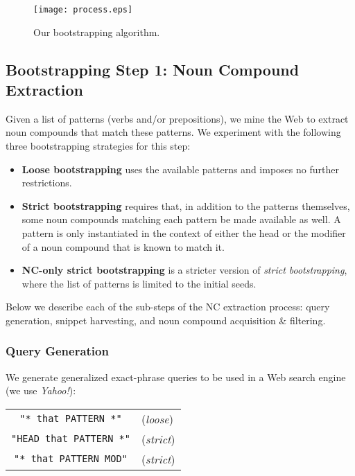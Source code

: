 \documentclass[letterpaper,11pt]{article}
\begin{document}
\begin{figure}[tbh]
\begin{center}
\texttt{[image: process.eps]}
\end{center}
\caption{Our bootstrapping algorithm.}
\label{fig:process}
\end{figure}


\subsection{Bootstrapping Step 1: Noun Compound Extraction}
\label{sec:extraction-nc}

Given a list of patterns (verbs and/or prepositions),
we mine the Web to extract noun compounds that match these patterns.
We experiment with the following three bootstrapping strategies for this step:

\begin{itemize}
\item \textbf{Loose bootstrapping} uses the available patterns and imposes no further restrictions.
\item \textbf{Strict bootstrapping} requires that, in addition to the patterns themselves, some noun compounds matching each pattern be made available as well. A pattern is only instantiated in the context of either the head or the modifier of a noun compound that is known to match it.
\item \textbf{NC-only strict bootstrapping} is a stricter version of \emph{strict bootstrapping}, where the list of patterns is limited to the initial seeds.
\end{itemize}


\noindent Below we describe each of the sub-steps of the NC extraction process:
query generation, snippet harvesting, and noun compound acquisition \& filtering.


\subsubsection{Query Generation}

We generate generalized exact-phrase queries
to be used in a Web search engine (we use \emph{Yahoo!}):
\begin{center}
\begin{tabular}{cl}
    \texttt{"* that PATTERN *"} & (\emph{loose})\\
    \texttt{"HEAD that PATTERN *"} & (\emph{strict})\\
    \texttt{"* that PATTERN MOD"} & (\emph{strict})\\
\end{tabular}
\end{center}
\end{document}
